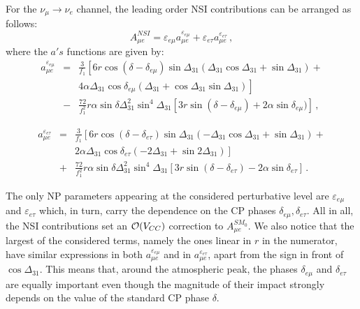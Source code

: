 \documentclass[12pt]{article}
\begin{document}
For the $\nu_\mu \to \nu_e$ channel, the leading order NSI contributions can be arranged as follows:
\begin{equation}
A_{\mu e}^{NSI} =\varepsilon_{e \mu} a_{\mu e}^{ \varepsilon_{e\mu}} +
\varepsilon_{e \tau} a_{\mu e}^{\varepsilon_{e\tau}}\,,
\label{mue_1}
\end{equation}
where the $a's$ functions are given by:
\begin{eqnarray}\nonumber
 a_{\mu e}^{\varepsilon_{e\mu}} &=& \frac{3}{f_1} \left[6r\cos(\delta-\delta_{e\mu}) \sin \Delta_{31} \left(\Delta_{31} \cos \Delta_{31}+\sin \Delta_{31}\right) \right. + \nonumber \\
 &&\left. 4 \alpha\Delta_{31}\cos\delta_{e\mu} \left(\Delta_{31}+ \cos \Delta_{31}\sin \Delta_{31}\right)\right] \label{mue_2}
 \\ &-& \frac{72}{f_1^2} r \alpha  \sin\delta\Delta_{31}^2 \sin^4\Delta_{31}\left[3 r \sin(\delta-\delta_{e\mu})+2\alpha \sin\delta_{e\mu})\right]\nonumber\,,
\end{eqnarray}


\begin{eqnarray}\nonumber
 a_{\mu e}^{\varepsilon_{e\tau}} &=& \frac{3}{f_1} \left[6r\cos(\delta-\delta_{e\tau}) \sin \Delta_{31} \left(-\Delta_{31} \cos \Delta_{31}+\sin \Delta_{31}\right) \right. + \nonumber \\ 
 &&\left. 2 \alpha\Delta_{31}\cos\delta_{e\tau} \left(-2\Delta_{31}+ \sin 2\Delta_{31}\right)\right] \label{mue_3_last}
 \\ &+& \frac{72}{f_1^2} r \alpha  \sin\delta\Delta_{31}^2 \sin^4\Delta_{31}\left[3 r \sin(\delta-\delta_{e\tau})-2\alpha \sin\delta_{e\tau}\right]\nonumber\,.
\end{eqnarray}

The only NP parameters appearing at the considered perturbative level are $\varepsilon_{e\mu}$
and $\varepsilon_{e\tau}$ which, in turn, carry the dependence on the CP phases $\delta_{e\mu},\delta_{e\tau}$. %
All in all, the NSI contributions set an ${\cal O} (V_{CC})$ correction to $A_{\mu e}^{SM_0}$.
We also notice that the largest of the considered terms, namely the ones linear in $r$ in the numerator, have similar expressions in both $a_{\mu e}^{\varepsilon_{e \mu}}$ and in $a_{\mu e}^{\varepsilon_{e\tau}}$, apart from the sign in front of $\cos{\Delta_{31}}$. This means that, around the atmospheric peak, the phases $\delta_{e\mu}$ and $\delta_{e\tau}$ are  equally important even though the magnitude of their impact strongly depends on the value of the standard CP phase $\delta$.
\end{document}
